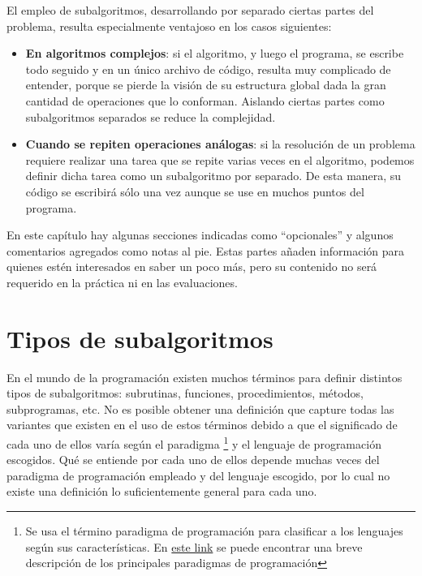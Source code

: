 \documentclass[
]{book}
\providecommand{\tightlist}{%
  \setlength{\itemsep}{0pt}\setlength{\parskip}{0pt}}
\begin{document}
El empleo de subalgoritmos, desarrollando por separado ciertas partes del problema, resulta especialmente ventajoso en los casos siguientes:

\begin{itemize}
\tightlist
\item
  \textbf{En algoritmos complejos}: si el algoritmo, y luego el programa, se escribe todo seguido y en un único archivo de código, resulta muy complicado de entender, porque se pierde la visión de su estructura global dada la gran cantidad de operaciones que lo conforman. Aislando ciertas partes como subalgoritmos separados se reduce la complejidad.
\item
  \textbf{Cuando se repiten operaciones análogas}: si la resolución de un problema requiere realizar una tarea que se repite varias veces en el algoritmo, podemos definir dicha tarea como un subalgoritmo por separado. De esta manera, su código se escribirá sólo una vez aunque se use en muchos puntos del programa.
\end{itemize}

En este capítulo hay algunas secciones indicadas como ``opcionales'' y algunos comentarios agregados como notas al pie. Estas partes añaden información para quienes estén interesados en saber un poco más, pero su contenido no será requerido en la práctica ni en las evaluaciones.

\hypertarget{tipos-de-subalgoritmos}{%
\section{Tipos de subalgoritmos}\label{tipos-de-subalgoritmos}}

En el mundo de la programación existen muchos términos para definir distintos tipos de subalgoritmos: subrutinas, funciones, procedimientos, métodos, subprogramas, etc. No es posible obtener una definición que capture todas las variantes que existen en el uso de estos términos debido a que el significado de cada uno de ellos varía según el paradigma
\footnote{Se usa el término paradigma de programación para clasificar a los lenguajes según sus características. En \href{https://hackr.io/blog/programming-paradigms}{este link} se puede encontrar una breve descripción de los principales paradigmas de programación}
y el lenguaje de programación escogidos. Qué se entiende por cada uno de ellos depende muchas veces del paradigma de programación empleado y del lenguaje escogido, por lo cual no existe una definición lo suficientemente general para cada uno.
\end{document}
